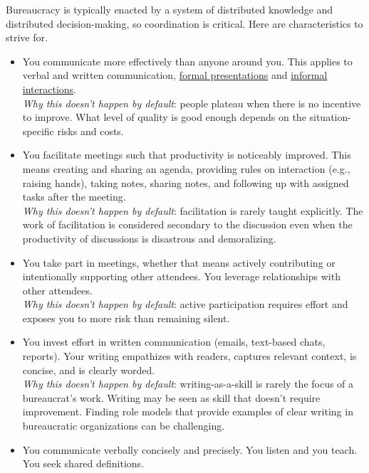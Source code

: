 Bureaucracy is typically enacted by a system of distributed knowledge and distributed decision-making, so coordination is critical. Here are characteristics to strive for. 
\begin{itemize}
    \item You communicate more effectively than anyone around you. This applies to verbal and written communication, \hyperref[sec:effective-presentations]{formal presentations} 
    and \hyperref[sec:walk-arounds]{informal interactions}. \\
    \textit{Why this doesn't happen by default}: people plateau when there is no incentive to improve. What level of quality is good enough depends on the situation-specific risks and costs.
    \item You facilitate meetings such that productivity is noticeably improved. This means creating and sharing an agenda, providing rules on interaction (e.g., raising hands), taking notes, sharing notes, and following up with assigned tasks after the meeting.\\
    \textit{Why this doesn't happen by default}: facilitation is rarely taught explicitly. The work of facilitation is considered secondary to the discussion even when the productivity of discussions is disastrous and demoralizing. 
    \item You take part in meetings, whether that means actively contributing or intentionally supporting other attendees. You leverage relationships with other attendees.\\ 
    \textit{Why this doesn't happen by default}: active participation requires effort and exposes you to more risk than remaining silent.
    \item You invest effort in written communication (emails, text-based chats, reports). Your writing empathizes with readers, captures relevant context, is concise, and is clearly worded.\\
    \textit{Why this doesn't happen by default}: writing-as-a-skill is rarely the focus of a bureaucrat's work. Writing may be seen as skill that doesn't require improvement. Finding role models that provide examples of clear writing in bureaucratic organizations can be challenging. 
    \item You communicate verbally concisely and precisely. You listen and you teach. You seek shared definitions. \\

\end{itemize}
